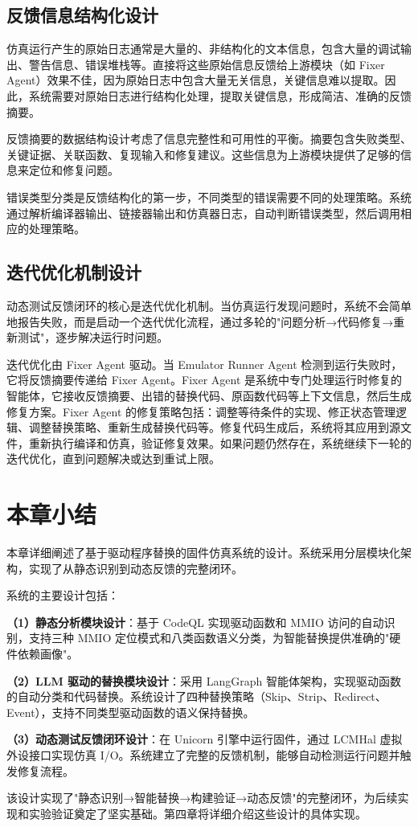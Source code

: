 \subsection{反馈信息结构化设计}

仿真运行产生的原始日志通常是大量的、非结构化的文本信息，包含大量的调试输出、警告信息、错误堆栈等。直接将这些原始信息反馈给上游模块（如 Fixer Agent）效果不佳，因为原始日志中包含大量无关信息，关键信息难以提取。因此，系统需要对原始日志进行结构化处理，提取关键信息，形成简洁、准确的反馈摘要。

反馈摘要的数据结构设计考虑了信息完整性和可用性的平衡。摘要包含失败类型、关键证据、关联函数、复现输入和修复建议。这些信息为上游模块提供了足够的信息来定位和修复问题。

错误类型分类是反馈结构化的第一步，不同类型的错误需要不同的处理策略。系统通过解析编译器输出、链接器输出和仿真器日志，自动判断错误类型，然后调用相应的处理策略。

\subsection{迭代优化机制设计}

动态测试反馈闭环的核心是迭代优化机制。当仿真运行发现问题时，系统不会简单地报告失败，而是启动一个迭代优化流程，通过多轮的"问题分析→代码修复→重新测试"，逐步解决运行时问题。

迭代优化由 Fixer Agent 驱动。当 Emulator Runner Agent 检测到运行失败时，它将反馈摘要传递给 Fixer Agent。Fixer Agent 是系统中专门处理运行时修复的智能体，它接收反馈摘要、出错的替换代码、原函数代码等上下文信息，然后生成修复方案。Fixer Agent 的修复策略包括：调整等待条件的实现、修正状态管理逻辑、调整替换策略、重新生成替换代码等。修复代码生成后，系统将其应用到源文件，重新执行编译和仿真，验证修复效果。如果问题仍然存在，系统继续下一轮的迭代优化，直到问题解决或达到重试上限。

\section{本章小结}
\label{sec:design_summary}

本章详细阐述了基于驱动程序替换的固件仿真系统的设计。系统采用分层模块化架构，实现了从静态识别到动态反馈的完整闭环。

系统的主要设计包括：

\textbf{（1）静态分析模块设计}：基于 CodeQL 实现驱动函数和 MMIO 访问的自动识别，支持三种 MMIO 定位模式和八类函数语义分类，为智能替换提供准确的"硬件依赖画像"。

\textbf{（2）LLM 驱动的替换模块设计}：采用 LangGraph 智能体架构，实现驱动函数的自动分类和代码替换。系统设计了四种替换策略（Skip、Strip、Redirect、Event），支持不同类型驱动函数的语义保持替换。

\textbf{（3）动态测试反馈闭环设计}：在 Unicorn 引擎中运行固件，通过 LCMHal 虚拟外设接口实现仿真 I/O。系统建立了完整的反馈机制，能够自动检测运行问题并触发修复流程。

该设计实现了"静态识别→智能替换→构建验证→动态反馈"的完整闭环，为后续实现和实验验证奠定了坚实基础。第四章将详细介绍这些设计的具体实现。
